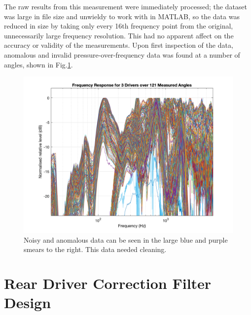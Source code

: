 \documentclass{report}
\begin{document}
        The raw results from this measurement were immediately processed; the dataset was large in file size and unwieldy to work with in MATLAB, so the data was reduced in size by taking only every 16th frequency point from the original, unnecessarily large frequency resolution.
        This had no apparent affect on the accuracy or validity of the measurements.
        Upon first inspection of the data, anomalous and invalid pressure-over-frequency data was found at a number of angles, shown in Fig.\ref{allAngles}.
        \begin{figure}[H]
            \centering
            \includegraphics[scale=0.35]{figs/allAngles.png}%
            \caption{Noisy and anomalous data can be seen in the large blue and purple smears to the right. This data needed cleaning.}
            \label{allAngles}
        \end{figure}

    
    \section{Rear Driver Correction Filter Design}
\end{document}
